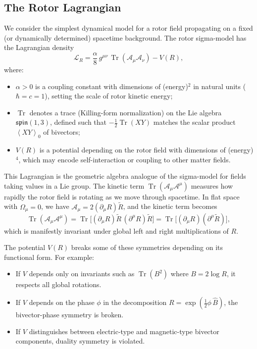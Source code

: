 \documentclass[11pt,a4paper]{article}
\numberwithin{equation}{section}
\theoremstyle{plain}
\theoremstyle{definition}
\theoremstyle{remark}
\DeclareMathOperator{\Tr}{Tr}
\newcommand{\ang}[1]{\left\langle #1 \right\rangle}
\begin{document}
\subsection{The Rotor Lagrangian}

We consider the simplest dynamical model for a rotor field propagating on a fixed (or dynamically determined) spacetime background. The rotor sigma-model has the Lagrangian density
\begin{equation}
\mathcal{L}_R = \frac{\alpha}{8}\, g^{\mu\nu}\,\Tr(\mathcal{A}_\mu\mathcal{A}_\nu) - V(R),
\label{eq:Lrot}
\end{equation}
where:

\begin{itemize}
  \item $\alpha>0$ is a coupling constant with dimensions of (energy)$^{2}$ in natural units ($\hbar = c = 1$), setting the scale of rotor kinetic energy;
  \item $\Tr$ denotes a trace (Killing-form normalization) on the Lie algebra $\mathfrak{spin}(1,3)$, defined such that $-\tfrac{1}{2}\Tr(XY)$ matches the scalar product $\ang{XY}_0$ of bivectors;
  \item $V(R)$ is a potential depending on the rotor field with dimensions of (energy)$^{4}$, which may encode self-interaction or coupling to other matter fields.
\end{itemize}

This Lagrangian is the geometric algebra analogue of the sigma-model for fields taking values in a Lie group. The kinetic term $\Tr(\mathcal{A}_\mu\mathcal{A}^\mu)$ measures how rapidly the rotor field is rotating as we move through spacetime. In flat space with $\Omega_\mu=0$, we have $\mathcal{A}_\mu = 2(\partial_\mu R)\widetilde{R}$, and the kinetic term becomes
\begin{equation}
\Tr(\mathcal{A}_\mu\mathcal{A}^\mu) = \Tr\big[(\partial_\mu R)\widetilde{R}\,(\partial^\mu R)\widetilde{R}\big] = \Tr\big[(\partial_\mu R)(\partial^\mu \widetilde{R})\big],
\end{equation}
which is manifestly invariant under global left and right multiplications of $R$.

The potential $V(R)$ breaks some of these symmetries depending on its functional form. For example:

\begin{itemize}
  \item If $V$ depends only on invariants such as $\Tr(B^2)$ where $B=2\log R$, it respects all global rotations.
  \item If $V$ depends on the phase $\phi$ in the decomposition $R=\exp(\frac{1}{2}\phi\,\hat{B})$, the bivector-phase symmetry is broken.
  \item If $V$ distinguishes between electric-type and magnetic-type bivector components, duality symmetry is violated.
\end{itemize}
\end{document}

